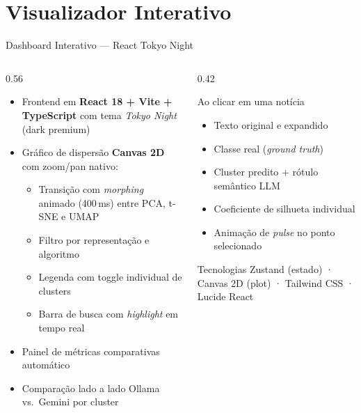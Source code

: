 \documentclass[aspectratio=169]{beamer}
\begin{document}
\section{Visualizador Interativo}
\begin{frame}{Dashboard Interativo — React Tokyo Night}
  \begin{columns}[T]
    \begin{column}{0.56\textwidth}
      \begin{itemize}\small
        \item Frontend em \textbf{React 18 + Vite + TypeScript} com tema
              \textit{Tokyo Night} (dark premium)
        \item Gráfico de dispersão \textbf{Canvas 2D} com zoom/pan nativo:
        \begin{itemize}\footnotesize
          \item Transição com \textit{morphing} animado (400\,ms)
                entre PCA, t-SNE e UMAP
          \item Filtro por representação e algoritmo
          \item Legenda com toggle individual de clusters
          \item Barra de busca com \textit{highlight} em tempo real
        \end{itemize}
        \item Painel de métricas comparativas automático
        \item Comparação lado a lado Ollama vs.\ Gemini por cluster
      \end{itemize}
    \end{column}
    \begin{column}{0.42\textwidth}
      \begin{block}{\small Ao clicar em uma notícia}
        \footnotesize
        \begin{itemize}
          \item Texto original e expandido
          \item Classe real (\textit{ground truth})
          \item Cluster predito + rótulo semântico LLM
          \item Coeficiente de silhueta individual
          \item Animação de \textit{pulse} no ponto selecionado
        \end{itemize}
      \end{block}
      \vspace{0.4em}
      \begin{block}{\small Tecnologias}
        \footnotesize Zustand (estado) · Canvas 2D (plot) ·
        Tailwind CSS · Lucide React
      \end{block}
    \end{column}
  \end{columns}
\end{frame}
\end{document}
